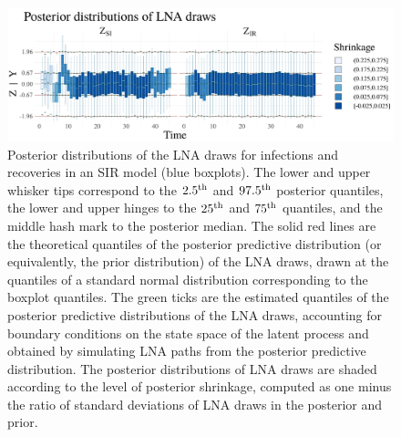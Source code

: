 \begin{figure}[htbp]
	\centering
	\includegraphics[width=\linewidth]{figures/sir_drawplots}
	\caption[Posterior distributions of LNA draws for an SIR model.]{Posterior distributions of the LNA draws for infections and recoveries in an SIR model (blue boxplots). The lower and upper whisker tips correspond to the $ 2.5^{\mathrm{th}} $ and $ 97.5^{\mathrm{th}} $ posterior quantiles, the lower and upper hinges to the $ 25^{\mathrm{th}} $ and $ 75^{\mathrm{th}} $ quantiles, and the middle hash mark to the posterior median. The solid red lines are the theoretical quantiles of the posterior predictive distribution (or equivalently, the prior distribution) of the LNA draws, drawn at the quantiles of a standard normal distribution corresponding to the boxplot quantiles. The green ticks are the estimated quantiles of the posterior predictive distributions of the LNA draws, accounting for boundary conditions on the state space of the latent process and obtained by simulating LNA paths from the posterior predictive distribution. The posterior distributions of LNA draws are shaded according to the level of posterior shrinkage, computed as one minus the ratio of standard deviations of LNA draws in the posterior and prior.}
	\label{fig:sir_drawplots}
\end{figure}


